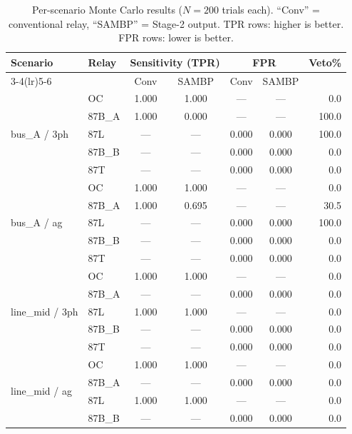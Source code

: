 \documentclass[12pt,a4paper]{article}
\begin{document}
\begin{table}[ht]
\centering
\caption{Per-scenario Monte Carlo results ($N=200$ trials each).
  ``Conv'' = conventional relay, ``SAMBP'' = Stage-2 output.
  TPR rows: higher is better.  FPR rows: lower is better.}
\label{tab:perscenario}
\small
\begin{tabular}{llccccr}
\toprule
Scenario & Relay &
  \multicolumn{2}{c}{Sensitivity (TPR)} &
  \multicolumn{2}{c}{FPR} &
  Veto\% \\
\cmidrule(lr){3-4}\cmidrule(lr){5-6}
 & & Conv & SAMBP & Conv & SAMBP & \\
\midrule
\multirow{5}{*}{bus\_A / 3ph}
  & OC      & 1.000 & 1.000 & ---   & ---   & 0.0 \\
  & 87B\_A  & 1.000 & \textcolor{warnred}{0.000} & ---   & ---   & \textcolor{warnred}{100.0} \\
  & 87L     & ---   & ---   & 0.000 & 0.000 & 100.0 \\
  & 87B\_B  & ---   & ---   & 0.000 & 0.000 & 0.0 \\
  & 87T     & ---   & ---   & 0.000 & 0.000 & 0.0 \\
\midrule
\multirow{5}{*}{bus\_A / ag}
  & OC      & 1.000 & 1.000 & ---   & ---   & 0.0 \\
  & 87B\_A  & 1.000 & \textcolor{warnorange}{0.695} & ---   & ---   & 30.5 \\
  & 87L     & ---   & ---   & 0.000 & 0.000 & 100.0 \\
  & 87B\_B  & ---   & ---   & 0.000 & 0.000 & 0.0 \\
  & 87T     & ---   & ---   & 0.000 & 0.000 & 0.0 \\
\midrule
\multirow{5}{*}{line\_mid / 3ph}
  & OC      & 1.000 & 1.000 & ---   & ---   & 0.0 \\
  & 87B\_A  & ---   & ---   & 0.000 & 0.000 & 0.0 \\
  & 87L     & 1.000 & 1.000 & ---   & ---   & 0.0 \\
  & 87B\_B  & ---   & ---   & 0.000 & 0.000 & 0.0 \\
  & 87T     & ---   & ---   & 0.000 & 0.000 & 0.0 \\
\midrule
\multirow{5}{*}{line\_mid / ag}
  & OC      & 1.000 & 1.000 & ---   & ---   & 0.0 \\
  & 87B\_A  & ---   & ---   & 0.000 & 0.000 & 0.0 \\
  & 87L     & 1.000 & 1.000 & ---   & ---   & 0.0 \\
  & 87B\_B  & ---   & ---   & 0.000 & 0.000 & 0.0 \\

\end{tabular}
\end{table}
\end{document}
